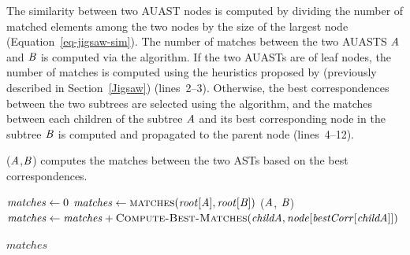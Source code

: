 


The similarity between two AUAST nodes is computed by dividing the number of matched elements among the two nodes by the size of the largest node (Equation~\ref{eq-jigsaw-sim}). The number of matches between the two AUASTS $\mathit{A}$ and $\mathit{B}$ is computed via the  algorithm. If the two AUASTs are of leaf nodes, the number of matches is computed using the heuristics proposed by \citet{2008:fse:cottrell} (previously described in Section~\ref{Jigsaw}) (lines~2--3). Otherwise, the best correspondences between the two subtrees are selected using the  algorithm, and the matches between each children of the subtree $\mathit{A}$ and its best corresponding node in the subtree $\mathit{B}$ is computed and propagated to the parent node (lines~4--12).


\begin{algorithm}
 \caption{($\mathit{A}$,$\mathit{B}$) computes the matches between the two ASTs based on the best correspondences.}
  \label{simi}
  \begin{algorithmic}[1]
  \ComputeBestMatches
  \State $\mathit{matches} \gets 0$
  \State $\mathit{matches} \gets   \textsc{matches}(\mathit{root}[\mathit{A}],\mathit{root}[\mathit{B}])$
    	\State {}($\mathit{A}$, $\mathit{B}$)
 		\State $\mathit{matches} \gets \mathit{matches}+\textsc{Compute-Best-Matches}(\mathit{childA},\mathit{node}[\mathit{bestCorr}[\mathit{childA}]])$		 
 \EndIf
 \EndFor

 \EndIf
 \Return $matches$
\end{algorithmic}
\end{algorithm}






